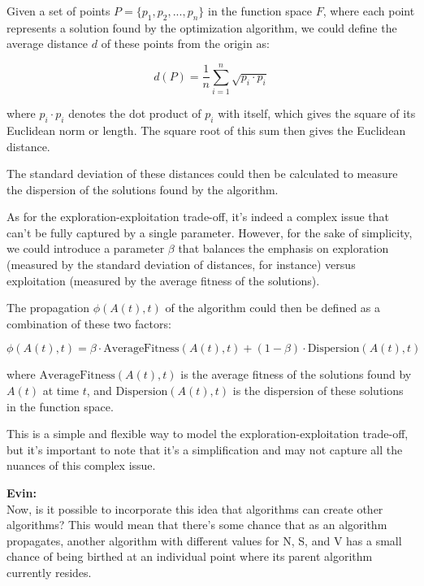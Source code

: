 \documentclass{article}[10pt]
\begin{document}
Given a set of points \( P = \{p_1, p_2, ..., p_n\} \) in the function space \( F \), where each point represents a solution found by the optimization algorithm, we could define the average distance \( d \) of these points from the origin as:

\[
d(P) = \frac{1}{n} \sum_{i=1}^{n} \sqrt{p_i \cdot p_i}
\]

where \( p_i \cdot p_i \) denotes the dot product of \( p_i \) with itself, which gives the square of its Euclidean norm or length. 
The square root of this sum then gives the Euclidean distance.\par

The standard deviation of these distances could then be calculated to measure the dispersion of the solutions found by the algorithm.\par

As for the exploration-exploitation trade-off, it's indeed a complex issue that can't be fully captured by a single parameter. 
However, for the sake of simplicity, we could introduce a parameter \( \beta \) that balances the emphasis on exploration (measured by the standard deviation of distances, for instance) versus exploitation (measured by the average fitness of the solutions).\par

The propagation \( \phi(A(t), t) \) of the algorithm could then be defined as a combination of these two factors:

\[
\phi(A(t), t) = \beta \cdot \text{AverageFitness}(A(t), t) + (1 - \beta) \cdot \text{Dispersion}(A(t), t)
\]

where \( \text{AverageFitness}(A(t), t) \) is the average fitness of the solutions found by \( A(t) \) at time \( t \), and \( \text{Dispersion}(A(t), t) \) is the dispersion of these solutions in the function space.\par

This is a simple and flexible way to model the exploration-exploitation trade-off, but it's important to note that it's a simplification and may not capture all the nuances of this complex issue.\par


\noindent \textbf{Evin:}\\
Now, is it possible to incorporate this idea that algorithms can create other algorithms? 
This would mean that there's some chance that as an algorithm propagates, another algorithm with different values for N, S, and V has a small chance of being birthed at an individual point where its parent algorithm currently resides.\par
\end{document}
